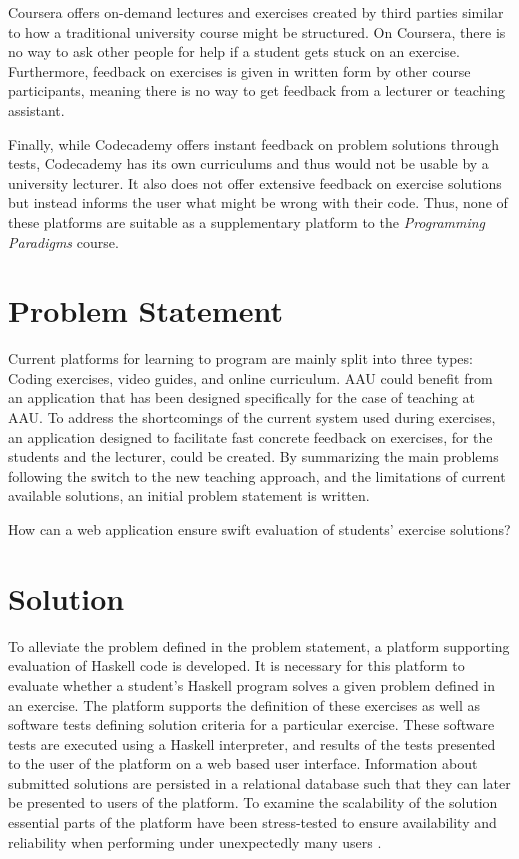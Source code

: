 Coursera offers on-demand lectures and exercises created by third parties similar to how a traditional university course might be structured.
On Coursera, there is no way to ask other people for help if a student gets stuck on an exercise.
Furthermore, feedback on exercises is given in written form by other course participants, meaning there is no way to get feedback from a lecturer or teaching assistant.


Finally, while Codecademy offers instant feedback on problem solutions through tests, Codecademy has its own curriculums and thus would not be usable by a university lecturer.
It also does not offer extensive feedback on exercise solutions but instead informs the user what might be wrong with their code.
Thus, none of these platforms are suitable as a supplementary platform to the \textit{Programming Paradigms} course.
\section{Problem Statement}
Current platforms for learning to program are mainly split into three types: Coding exercises, video guides, and online curriculum.
AAU could benefit from an application that has been designed specifically for the case of teaching at AAU.
To address the shortcomings of the current system used during exercises, an application designed to facilitate fast concrete feedback on exercises, for the students and the lecturer, could be created.
By summarizing the main problems following the switch to the new teaching approach, and the limitations of current available solutions, an initial problem statement is written.
\begin{displayquote}
    How can a web application ensure swift evaluation of students' exercise solutions?
\end{displayquote}

\section{Solution}
To alleviate the problem defined in the problem statement, a platform supporting evaluation of Haskell code is developed. It is necessary for this platform to evaluate whether a student's Haskell program solves a given problem defined in an exercise. The platform supports the definition of these exercises as well as software tests defining solution criteria for a particular exercise. These software tests are executed using a Haskell interpreter, and results of the tests presented to the user of the platform on a web based user interface.
Information about submitted solutions are persisted in a relational database such that they can later be presented to users of the platform.
To examine the scalability of the solution essential parts of the platform have been stress-tested to ensure availability and reliability when performing under unexpectedly many users \cite{Sommerville10}.

